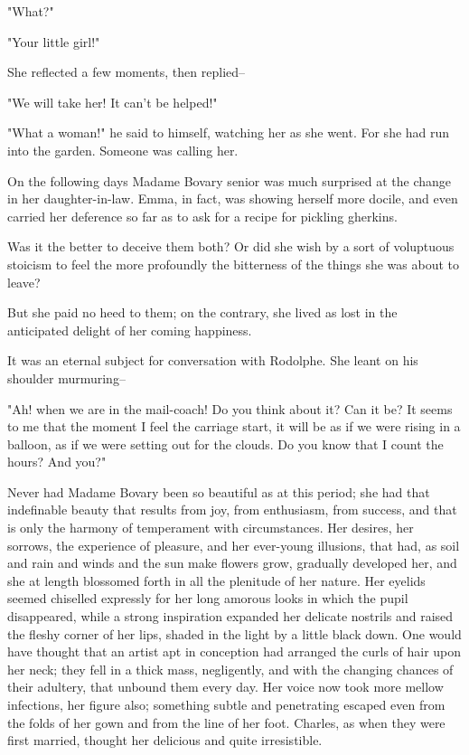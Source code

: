\documentclass[11pt,twocolumn]{ltugboat}
\begin{document}
"What?"

"Your little girl!"

She reflected a few moments, then replied--

"We will take her! It can't be helped!"

"What a woman!" he said to himself, watching her as she went. For she
had run into the garden. Someone was calling her.

On the following days Madame Bovary senior was much surprised at the
change in her daughter-in-law. Emma, in fact, was showing herself more
docile, and even carried her deference so far as to ask for a recipe for
pickling gherkins.

Was it the better to deceive them both? Or did she wish by a sort of
voluptuous stoicism to feel the more profoundly the bitterness of the
things she was about to leave?

But she paid no heed to them; on the contrary, she lived as lost in the
anticipated delight of her coming happiness.

It was an eternal subject for conversation with Rodolphe. She leant on
his shoulder murmuring--

"Ah! when we are in the mail-coach! Do you think about it? Can it be? It
seems to me that the moment I feel the carriage start, it will be as if
we were rising in a balloon, as if we were setting out for the clouds.
Do you know that I count the hours? And you?"

Never had Madame Bovary been so beautiful as at this period; she had
that indefinable beauty that results from joy, from enthusiasm, from
success, and that is only the harmony of temperament with circumstances.
Her desires, her sorrows, the experience of pleasure, and her ever-young
illusions, that had, as soil and rain and winds and the sun make flowers
grow, gradually developed her, and she at length blossomed forth in all
the plenitude of her nature. Her eyelids seemed chiselled expressly for
her long amorous looks in which the pupil disappeared, while a strong
inspiration expanded her delicate nostrils and raised the fleshy corner
of her lips, shaded in the light by a little black down. One would have
thought that an artist apt in conception had arranged the curls of hair
upon her neck; they fell in a thick mass, negligently, and with the
changing chances of their adultery, that unbound them every day. Her
voice now took more mellow infections, her figure also; something subtle
and penetrating escaped even from the folds of her gown and from the
line of her foot. Charles, as when they were first married, thought her
delicious and quite irresistible.
\end{document}
